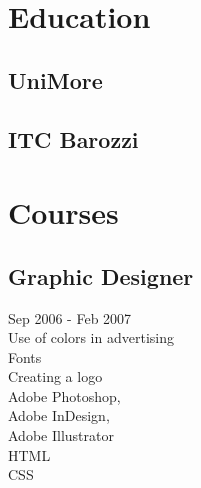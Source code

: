 \documentclass[letterpaper]{deedy-resume} %
\begin{document}
\begin{minipage}[t]{0.33\textwidth} %


\section{Education} 

\subsection{UniMore}



\sectionspace %


\subsection{ITC Barozzi}

\sectionspace %



\section{Courses}

\subsection{Graphic Designer}
Sep 2006 - Feb 2007 \\
Use of colors in advertising \\
Fonts \\
Creating a logo \\
Adobe Photoshop, \\
Adobe InDesign, \\
Adobe Illustrator \\
HTML \\
CSS



\end{minipage}
\end{document}
